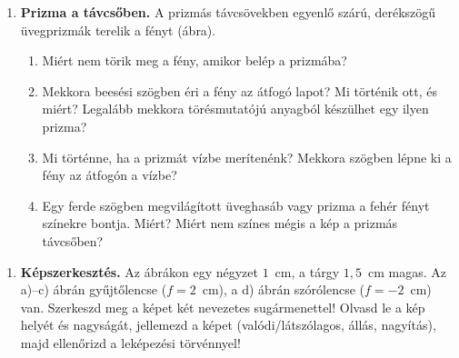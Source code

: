 \documentclass[12pt]{article}
\begin{document}
\vspace{10pt}
\begin{minipage}[t]{0.70\linewidth}\vspace{0pt}
\begin{enumerate}[start=3]
\item \textbf{Prizma a távcsőben.} A prizmás távcsövekben egyenlő szárú, derékszögű
  üvegprizmák terelik a fényt (ábra).
  \begin{enumerate}
    \item Miért nem törik meg a fény, amikor belép a prizmába?
    \item Mekkora beesési szögben éri a fény az átfogó lapot? Mi történik ott, és miért?
      Legalább mekkora törésmutatójú anyagból készülhet egy ilyen prizma?
    \item Mi történne, ha a prizmát vízbe merítenénk? Mekkora szögben lépne ki a fény az
      átfogón a vízbe?
    \item Egy ferde szögben megvilágított üveghasáb vagy prizma a fehér fényt színekre
      bontja. Miért? Miért nem színes mégis a kép a prizmás távcsőben?
  \end{enumerate}
\end{enumerate}
\end{minipage}\hfill
\begin{minipage}[t]{0.27\linewidth}\vspace{0pt}\centering
{}
\end{minipage}

\newpage
\begin{enumerate}[start=4]
\item \textbf{Képszerkesztés.} Az ábrákon egy négyzet $1$~cm, a tárgy $1{,}5$~cm magas. Az
  a)--c) ábrán gyűjtőlencse ($f = 2$~cm), a d) ábrán szórólencse ($f = -2$~cm) van.
  Szerkeszd meg a képet két nevezetes sugármenettel! Olvasd le a kép helyét és nagyságát,
  jellemezd a képet (valódi/látszólagos, állás, nagyítás), majd ellenőrizd a leképezési
  törvénnyel!
\end{enumerate}
\end{document}
